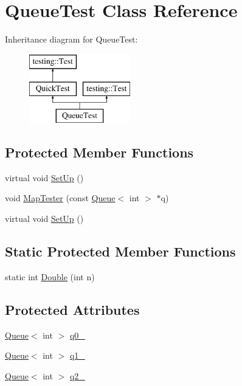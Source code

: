 \hypertarget{class_queue_test}{}\section{Queue\+Test Class Reference}
\label{class_queue_test}
Inheritance diagram for Queue\+Test\+:\begin{figure}[H]
\begin{center}
\leavevmode
\includegraphics[height=3.000000cm]{class_queue_test}
\end{center}
\end{figure}
\subsection*{Protected Member Functions}
\begin{DoxyCompactItemize}
\item 
virtual void \hyperlink{class_queue_test_a91e69958f086239a523864d6b94ab174}{Set\+Up} ()
\item 
void \hyperlink{class_queue_test_a7f1661cd16c428a130d6ac1e4246eaab}{Map\+Tester} (const \hyperlink{class_queue}{Queue}$<$ int $>$ $\ast$q)
\item 
virtual void \hyperlink{class_queue_test_a91e69958f086239a523864d6b94ab174}{Set\+Up} ()
\end{DoxyCompactItemize}
\subsection*{Static Protected Member Functions}
\begin{DoxyCompactItemize}
\item 
static int \hyperlink{class_queue_test_a2c7e0d1edb558dbbc4c085316d3d1ee6}{Double} (int n)
\end{DoxyCompactItemize}
\subsection*{Protected Attributes}
\begin{DoxyCompactItemize}
\item 
\hyperlink{class_queue}{Queue}$<$ int $>$ \hyperlink{class_queue_test_a0eba1fe2b31d75abd2df688ca5245e22}{q0\+\_\+}
\item 
\hyperlink{class_queue}{Queue}$<$ int $>$ \hyperlink{class_queue_test_a1e55594e71820ba0f1b09591fb328c30}{q1\+\_\+}
\item 
\hyperlink{class_queue}{Queue}$<$ int $>$ \hyperlink{class_queue_test_aeb7a2e3f6ce2d97d84eb1e01468adc2f}{q2\+\_\+}
\end{DoxyCompactItemize}
